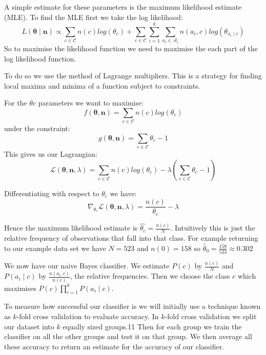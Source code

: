 A simple estimate for these parameters is the maximum likelihood estimate (MLE).
To find the MLE first we take the log likelihood:
\begin{equation}
	L(\mathbf{\theta} \mid \mathbf{n}) \propto \sum_{c \in \mathcal{C}}  n(c)log(\theta_c) + \sum_{c \in \mathcal{C}} \sum_{i=1}^k \sum_{a_i \in \mathcal{A}_i} n(a_i, c) log(\theta_{a_i \mid c}) 
\end{equation}
So to maximise the likelihood function we need to maximise the each part of the log likelihood function.

To do so we use the method of Lagrange multipliers.
This is a strategy for finding local maxima and minima of a function subject to constraints.

For the $\theta{c}$ parameters we want to maximise:
\begin{equation}
	f(\mathbf{\theta}, \mathbf{n}) = \sum_{c \in \mathcal{C}}  n(c)log(\theta_c)
\end{equation}
under the constraint:
\begin{equation}
	g(\mathbf{\theta}, \mathbf{n}) = \sum_{c \in \mathcal{C}}  \theta_c - 1
\end{equation}
This gives us our Lagrangian:
\begin{equation}
	\mathcal{L}(\mathbf{\theta}, \mathbf{n}, \lambda) = \sum_{c \in \mathcal{C}}  n(c)log(\theta_c) - \lambda(\sum_{c \in \mathcal{C}}  \theta_c - 1)
\end{equation}

Differentiating with respect to $\theta_c$ we have:
\begin{equation}
	\nabla_{\theta_c} \mathcal{L}(\mathbf{\theta}, \mathbf{n}, \lambda) = \frac{n(c)}{\theta_c} - \lambda
\end{equation}

Hence the maximum likelihood estimate is $\hat{\theta_c} = \frac{n(c)}{N}$.
Intuitively this is just the relative frequency of observations that fall into that class.
For example returning to our example data set we have $N=523$ and $n(0)=158$ so $\hat\theta_0 = \frac{158}{523} \approx 0.302$


We now have our naive Bayes classifier.
We estimate $P(c)$ by $\frac{n(c)}{N}$ and $P(a_i \mid c)$ by $\frac{n(a_i, c)}{n(c)}$, the relative frequencies.
Then we choose the class $c$ which maximises $P(c)\prod_{i=1}^{k}P(a_i \mid c)$.

To measure how successful our classifier is we will initially use a technique known as $k$-fold cross validation to evaluate accuracy.
In $k$-fold cross validation we split our dataset into $k$ equally sized groups.11
Then for each group we train the classifier on all the other groups and test it on that group.
We then average all these accuracy to return an estimate for the accuracy of our classifier.

